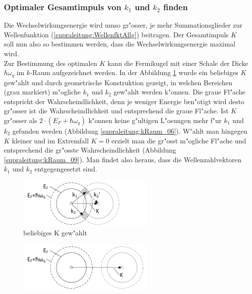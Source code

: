 \begin{refsection}
\subsubsection{Optimaler Gesamtimpuls von $k_1$ und $k_2$ finden}
Die Wechselwirkungsenergie wird umso gr"osser, je mehr Summationsglieder zur Wellenfunktion (\ref{supraleitung:WellenfktAllg}) beitragen. Der Gesamtimpuls $K$ soll nun also so bestimmen werden, dass die Wechselwirkungsenergie maximal wird.
\\
Zur Bestimmung des optimalen $K$ kann die Fermikugel mit einer Schale der Dicke $\hbar\omega_q$ im $k$-Raum aufgezeichnet werden. In der Abbildung \ref{supraleitung:kRaum_05} wurde ein beliebiges $K$ gew"ahlt und durch geometrische Konstruktion gezeigt, in welchen Bereichen (grau markiert) m"ogliche $k_1$ und $k_2$ gew"ahlt werden k"onnen. Die graue Fl"ache entspricht der Wahrscheindlichkeit, denn je weniger Energie ben"otigt wird desto gr"osser ist die Wahrscheindlichkeit und entsprechend die graue Fl"ache. Ist $K$ gr"osser als $2\cdot(E_F+\hbar\omega_q)$ k"onnen keine g"ultigen L"osungen mehr f"ur $k_1$ und $k_2$ gefunden werden (Abbildung \ref{supraleitung:kRaum_06}). W"ahlt man hingegen $K$ kleiner und im Extremfall $K=0$ erzielt man die gr"osst m"ogliche Fl"ache und entsprechend die gr"osste Wahrscheindlichkeit (Abbildung \ref{supraleitung:kRaum_09}). Man findet also heraus, dass die Wellenzahlvektoren $k_1$ und $k_2$ entgegengesetzt sind.
\\
\begin{figure}	
\centering
\includegraphics[width=0.6\textwidth]{supraleitung/kGraphic_05.png} %
\caption{beliebiges K gew"ahlt
\label{supraleitung:kRaum_05}}
\end{figure}
\begin{figure}	
\centering
\includegraphics[width=0.6\textwidth]{supraleitung/kGraphic_06.png} %

\end{figure}
\end{refsection}
